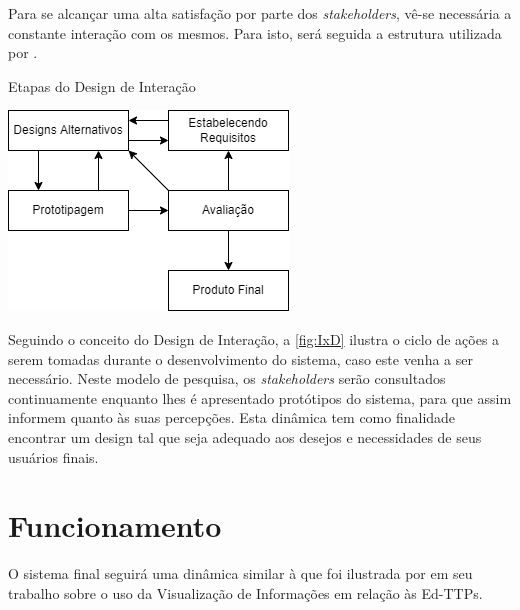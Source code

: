 Para se alcançar uma alta satisfação por parte dos \textit{stakeholders}, vê-se necessária a constante interação com os mesmos. Para isto, será seguida a estrutura utilizada por \cite{andre_interaction_2018}.

\begin{MyCenteredFigure}
  \caption{Etapas do Design de Interação}
  \label{fig:IxD}
  \includegraphics{files/img/Arquitetura/Arquitetura-IxD}
\end{MyCenteredFigure}    %

Seguindo o conceito do Design de Interação, a \autoref{fig:IxD} ilustra o ciclo de ações a serem tomadas durante o desenvolvimento do sistema, caso este venha a ser necessário. Neste modelo de pesquisa, os \textit{stakeholders} serão consultados continuamente enquanto lhes é apresentado protótipos do sistema, para que assim informem quanto às suas percepções. Esta dinâmica tem como finalidade encontrar um design tal que seja adequado aos desejos e necessidades de seus usuários finais.

\section{Funcionamento}

O sistema final seguirá uma dinâmica similar à que foi ilustrada por \cite{bebis_information_2019} em seu trabalho sobre o uso da Visualização de Informações em relação às Ed-TTPs.

